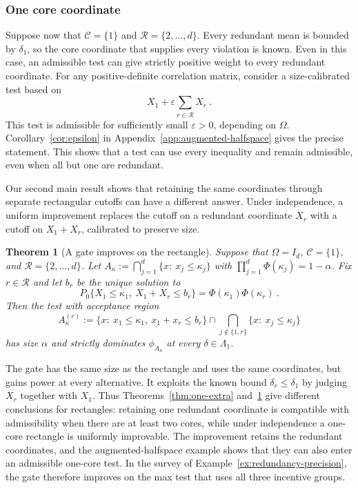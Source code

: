 \documentclass[11pt]{article}
\numberwithin{equation}{section}
\newtheorem{theorem}{Theorem}
\theoremstyle{definition}
\begin{document}
\subsubsection*{One core coordinate}

Suppose now that $\mathcal C=\{1\}$ and $\mathcal R=\{2,\dots,d\}$. Every redundant mean is bounded by $\delta_1$, so the core coordinate that supplies every violation is known. Even in this case, an admissible test can give strictly positive weight to every redundant coordinate. For any positive-definite correlation matrix, consider a size-calibrated test based on
\[
X_1+\varepsilon\sum_{r\in\mathcal R}X_r~.
\]
This test is admissible for sufficiently small $\varepsilon>0$, depending on $\Omega$. Corollary~\ref{cor:epsilon} in Appendix~\ref{app:augmented-halfspace} gives the precise statement. This shows that a test can use every inequality and remain admissible, even when all but one are redundant.

Our second main result shows that retaining the same coordinates through separate rectangular cutoffs can have a different answer. Under independence, a uniform improvement replaces the cutoff on a redundant coordinate $X_r$ with a cutoff on $X_1+X_r$, calibrated to preserve size.


\begin{theorem}[A gate improves on the rectangle]\label{thm:gate}
  Suppose that $\Omega=I_d$, $\mathcal C=\{1\}$, and $\mathcal R=\{2,\dots,d\}$. Let $A_\kappa:=\bigcap_{j=1}^d\{x:\ x_j\le\kappa_j\}$ with $\prod_{j=1}^d\Phi(\kappa_j)=1-\alpha$. Fix $r\in\mathcal R$ and let $b_r$ be the unique solution to
  \begin{equation}\label{eq:gate-calibration}
  P_0\{X_1\le\kappa_1,\ X_1+X_r\le b_r\}=\Phi(\kappa_1)\Phi(\kappa_r)~.
  \end{equation}
  Then the test with acceptance region
  \[
  A_\kappa^{(r)}:=\{x:\ x_1\le\kappa_1,\ x_1+x_r\le b_r\}\cap\bigcap_{j\notin\{1,r\}}\{x:\ x_j\le\kappa_j\}
  \]
  has size $\alpha$ and strictly dominates $\phi_{A_\kappa}$ at every $\delta\in\Lambda_1$.
  \end{theorem}

The gate has the same size as the rectangle and uses the same coordinates, but gains power at every alternative. It exploits the known bound $\delta_r\le\delta_1$ by judging $X_r$ together with $X_1$. Thus Theorems~\ref{thm:one-extra} and~\ref{thm:gate} give different conclusions for rectangles: retaining one redundant coordinate is compatible with admissibility when there are at least two cores, while under independence a one-core rectangle is uniformly improvable. The improvement retains the redundant coordinates, and the augmented-halfspace example shows that they can also enter an admissible one-core test. In the survey of Example~\ref{ex:redundancy-precision}, the gate therefore improves on the max test that uses all three incentive groups.
\end{document}
